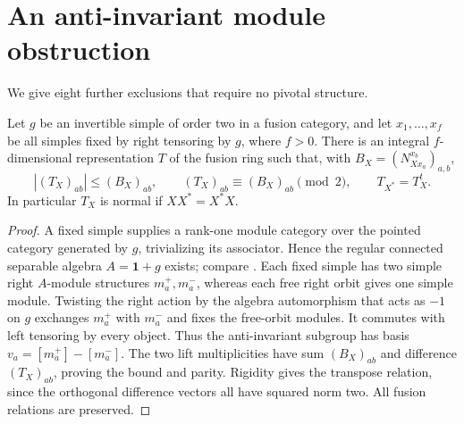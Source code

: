 \section{An anti-invariant module obstruction}
\label{sec:r8-anti-module}
We give eight further exclusions that require no pivotal structure.

\begin{lemma}\label{lem:r8-anti-module}
Let $g$ be an invertible simple of order two in a fusion category, and
let $x_1,\ldots,x_f$ be all simples fixed by right tensoring by $g$,
where $f>0$. There is an integral $f$-dimensional representation $T$ of
the fusion ring such that, with $B_X=(N_{Xx_a}^{x_b})_{a,b}$,
\[
 |(T_X)_{ab}|\leq (B_X)_{ab},\qquad
 (T_X)_{ab}\equiv(B_X)_{ab}\pmod2,\qquad T_{X^*}=T_X^t.
\]
In particular $T_X$ is normal if $XX^*=X^*X$.
\end{lemma}
\begin{proof}
A fixed simple supplies a rank-one module category over the pointed
category generated by $g$, trivializing its associator. Hence the
regular connected separable algebra $A=\mathbf1+g$ exists; compare
\cite[Lemmas~6.1--6.2]{EGODimPQ}. Each fixed simple has two simple right
$A$-module structures $m_a^+,m_a^-$, whereas each free right orbit gives
one simple module. Twisting the right action by the algebra automorphism
that acts as $-1$ on $g$ exchanges $m_a^+$ with $m_a^-$ and fixes the
free-orbit modules. It commutes with left tensoring by every object.
Thus the anti-invariant subgroup has basis
$v_a=[m_a^+]-[m_a^-]$. The two lift multiplicities have sum
$(B_X)_{ab}$ and difference $(T_X)_{ab}$, proving the bound and parity.
Rigidity gives the transpose relation, since the orthogonal difference
vectors all have squared norm two. All fusion relations are preserved.
\end{proof}

